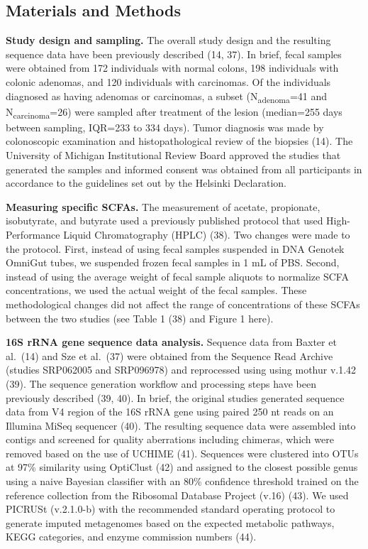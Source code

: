 \documentclass[11pt,]{article}
\begin{document}
\newpage

\hypertarget{materials-and-methods}{%
\subsection{Materials and Methods}\label{materials-and-methods}}

\textbf{Study design and sampling.} The overall study design and the
resulting sequence data have been previously described (14, 37). In
brief, fecal samples were obtained from 172 individuals with normal
colons, 198 individuals with colonic adenomas, and 120 individuals with
carcinomas. Of the individuals diagnosed as having adenomas or
carcinomas, a subset (N\textsubscript{adenoma}=41 and
N\textsubscript{carcinoma}=26) were sampled after treatment of the
lesion (median=255 days between sampling, IQR=233 to 334 days). Tumor
diagnosis was made by colonoscopic examination and histopathological
review of the biopsies (14). The University of Michigan Institutional
Review Board approved the studies that generated the samples and
informed consent was obtained from all participants in accordance to the
guidelines set out by the Helsinki Declaration.

\textbf{Measuring specific SCFAs.} The measurement of acetate,
propionate, isobutyrate, and butyrate used a previously published
protocol that used High-Performance Liquid Chromatography (HPLC) (38).
Two changes were made to the protocol. First, instead of using fecal
samples suspended in DNA Genotek OmniGut tubes, we suspended frozen
fecal samples in 1 mL of PBS. Second, instead of using the average
weight of fecal sample aliquots to normalize SCFA concentrations, we
used the actual weight of the fecal samples. These methodological
changes did not affect the range of concentrations of these SCFAs
between the two studies (see Table 1 (38) and Figure 1 here).

\textbf{16S rRNA gene sequence data analysis.} Sequence data from Baxter
et al.~(14) and Sze et al.~(37) were obtained from the Sequence Read
Archive (studies SRP062005 and SRP096978) and reprocessed using using
mothur v.1.42 (39). The sequence generation workflow and processing
steps have been previously described (39, 40). In brief, the original
studies generated sequence data from V4 region of the 16S rRNA gene
using paired 250 nt reads on an Illumina MiSeq sequencer (40). The
resulting sequence data were assembled into contigs and screened for
quality aberrations including chimeras, which were removed based on the
use of UCHIME (41). Sequences were clustered into OTUs at 97\%
similarity using OptiClust (42) and assigned to the closest possible
genus using a naive Bayesian classifier with an 80\% confidence
threshold trained on the reference collection from the Ribosomal
Database Project (v.16) (43). We used PICRUSt (v.2.1.0-b) with the
recommended standard operating protocol to generate imputed metagenomes
based on the expected metabolic pathways, KEGG categories, and enzyme
commission numbers (44).
\end{document}
